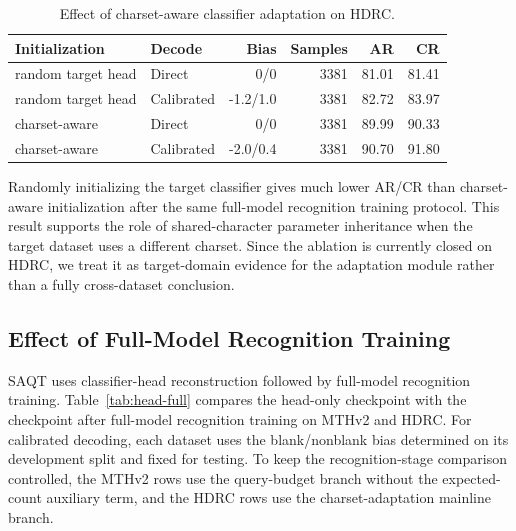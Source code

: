 \begin{table}[t]
\centering
\caption{Effect of charset-aware classifier adaptation on HDRC.}
\label{tab:charset-adaptation}
\begin{tabular}{llrrrr}
\toprule
Initialization & Decode & Bias & Samples & AR & CR \\
\midrule
random target head & Direct & 0/0 & 3381 & 81.01 & 81.41 \\
random target head & Calibrated & -1.2/1.0 & 3381 & 82.72 & 83.97 \\
charset-aware & Direct & 0/0 & 3381 & 89.99 & 90.33 \\
charset-aware & Calibrated & -2.0/0.4 & 3381 & 90.70 & 91.80 \\
\bottomrule
\end{tabular}
\end{table}

Randomly initializing the target classifier gives much lower AR/CR than charset-aware initialization after the same full-model recognition training protocol. This result supports the role of shared-character parameter inheritance when the target dataset uses a different charset. Since the ablation is currently closed on HDRC, we treat it as target-domain evidence for the adaptation module rather than a fully cross-dataset conclusion.

\subsection{Effect of Full-Model Recognition Training}

SAQT uses classifier-head reconstruction followed by full-model recognition training. Table~\ref{tab:head-full} compares the head-only checkpoint with the checkpoint after full-model recognition training on MTHv2 and HDRC. For calibrated decoding, each dataset uses the blank/nonblank bias determined on its development split and fixed for testing. To keep the recognition-stage comparison controlled, the MTHv2 rows use the query-budget branch without the expected-count auxiliary term, and the HDRC rows use the charset-adaptation mainline branch.

